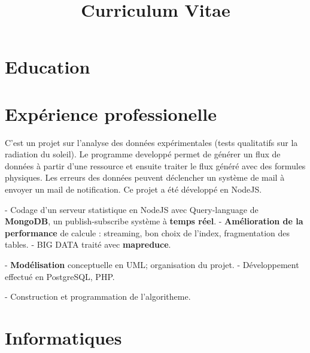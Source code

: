 \documentclass[11pt,a4paper]{moderncv}
\title{Curriculum Vitae}
\begin{document}
\maketitle

\section{Education}


\section{Expérience professionelle}
{
C'est un projet sur l'analyse des données expérimentales (tests qualitatifs sur la radiation du soleil). Le programme developpé permet de générer un flux de données à partir d'une ressource et ensuite traiter le flux généré avec des formules physiques. Les erreurs des données peuvent déclencher un système de mail à envoyer un mail de notification. Ce projet a été développé en NodeJS.
}

{
- Codage d'un serveur statistique en NodeJS avec Query-language de \textbf{MongoDB}, un publish-subscribe système à \textbf{temps réel}.\newline
- \textbf{Amélioration de la performance} de calcule : streaming, bon choix de l'index, fragmentation des tables.\newline
- BIG DATA traité avec \textbf{mapreduce}.
}

{
- \textbf{Modélisation} conceptuelle en UML; organisation du projet.\newline
- Développement effectué en PostgreSQL, PHP.
}

{
- Construction et programmation de l'algoritheme.
}

\section{Informatiques}
\end{document}

